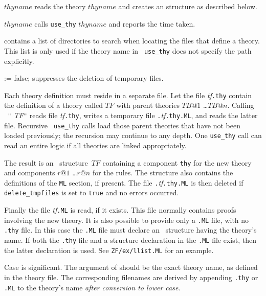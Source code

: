 \begin{ttdescription}
\item[\ttindexbold{use_thy} $thyname$] 
  reads the theory $thyname$ and creates an \ML{} structure as described below.

\item[\ttindexbold{time_use_thy} $thyname$] 
  calls {\tt use_thy} $thyname$ and reports the time taken.

\item[\ttindexbold{loadpath}] 
  contains a list of directories to search when locating the files that
  define a theory.  This list is only used if the theory name in {\tt
    use_thy} does not specify the path explicitly.

\item[\ttindexbold{delete_tmpfiles} := false;] 
suppresses the deletion of temporary files.
\end{ttdescription}
%
Each theory definition must reside in a separate file.  Let the file {\it
  tf}{\tt.thy} contain the definition of a theory called $TF$ with parent
theories $TB@1$ \dots $TB@n$.  Calling ~{\tt"}{\it
  TF\/}{\tt"} reads file {\it tf}{\tt.thy}, writes a temporary \ML{}
file {\tt.}{\it tf}{\tt.thy.ML}, and reads the latter file.  Recursive {\tt
  use_thy} calls load those parent theories that have not been loaded
previously; the recursion may continue to any depth.  One {\tt use_thy}
call can read an entire logic if all theories are linked appropriately.

The result is an \ML\ structure~$TF$ containing a component {\tt thy} for
the new theory and components $r@1$ \dots $r@n$ for the rules.  The
structure also contains the definitions of the {\tt ML} section, if
present.  The file {\tt.}{\it tf}{\tt.thy.ML} is then deleted if
{\tt delete_tmpfiles} is set to {\tt true} and no errors occurred.

Finally the file {\it tf}{\tt.ML} is read, if it exists.  This file
normally contains proofs involving the new theory.  It is also possible to
provide only a {\tt.ML} file, with no {\tt.thy} file.  In this case the
{\tt.ML} file must declare an \ML\ structure having the theory's name.  If
both the {\tt.thy} file and a structure declaration in the {\tt.ML} file
exist, then the latter declaration is used.  See {\tt ZF/ex/llist.ML} for
an example.

\begin{warn}
  Case is significant.  The argument of  should be the
  exact theory name, as defined in the theory file.  The corresponding
  filenames are derived by appending {\tt.thy} or {\tt.ML} to the theory's
  name {\it after conversion to lower case}.
\end{warn}

